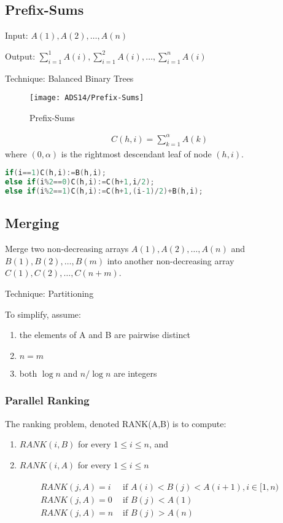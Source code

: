 \subsection{Prefix-Sums}
Input:  $A(1), A(2), \dots, A(n)$

Output: $\displaystyle \sum_{i=1}^1A(i), \sum_{i=1}^2A(i), \dots, \sum_{i=1}^nA(i)$

Technique: Balanced Binary Trees

\begin{figure}[!htb]
    \centering
    \texttt{[image: ADS14/Prefix-Sums]}
    \caption{Prefix-Sums}
\end{figure}

\begin{align*}
    C(h,i)=\sum_{k=1}^\alpha A(k)
\end{align*}
where $(0, \alpha)$ is the rightmost descendant leaf of node $(h,i)$. 
\begin{lstlisting}[language={c++}]
if(i==1)C(h,i):=B(h,i);
else if(i%2==0)C(h,i):=C(h+1,i/2);
else if(i%2==1)C(h,i):=C(h+1,(i-1)/2)+B(h,i);
\end{lstlisting}

\subsection{Merging}
Merge two non-decreasing arrays $A(1), A(2), \dots, A(n)$ and $B(1), B(2), \dots, B(m)$ into another non-decreasing array $C(1), C(2), \dots, C(n+m)$. 

Technique: Partitioning

To simplify, assume:
\begin{enumerate}
    \item  the elements of A and B are pairwise distinct
    \item $n = m$
    \item both $\log n$ and $n/\log n$ are integers
\end{enumerate}

\subsubsection{Parallel Ranking}
The ranking problem, denoted RANK(A,B) is to compute: 
\begin{enumerate}
    \item $RANK( i, B)$ for every $1 \le i \le n$, and
    \item $RANK( i, A)$ for every $1 \le i \le n$
\end{enumerate}
\begin{align*}
    \begin{array}{ll}
        RANK( j, A) = i& \text{ if }A(i) < B(j) < A(i + 1), i\in [1, n)\\
        RANK( j, A) = 0& \text{ if }B(j) < A(1)\\ 
        RANK( j, A) = n& \text{ if }B(j) > A(n)
    \end{array}
\end{align*}

